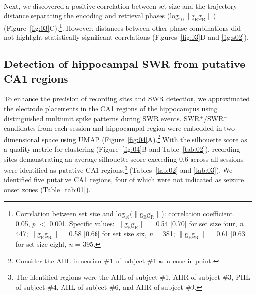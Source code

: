 \documentclass[final,3p,times,twocolumn]{elsarticle}
\providecommand{\DIFaddbegin}{} %
\providecommand{\DIFaddend}{} %
\providecommand{\DIFdelbegin}{} %
\providecommand{\DIFdelend}{} %
\newcommand{\DIFscaledelfig}{0.5}
\newlength{\DIFdelgraphicswidth} %
\newlength{\DIFdelgraphicsheight} %
\newcommand{\DIFaddincludegraphics}[2][]{{\color{blue}\fbox{\DIFOincludegraphics[#1]{#2}}}} %
\newcommand{\DIFdelincludegraphics}[2][]{%
\sbox{\DIFdelgraphicsbox}{\DIFOincludegraphics[#1]{#2}}%
\settoboxwidth{\DIFdelgraphicswidth}{\DIFdelgraphicsbox} %
\settoboxtotalheight{\DIFdelgraphicsheight}{\DIFdelgraphicsbox} %
\scalebox{\DIFscaledelfig}{%
\parbox[b]{\DIFdelgraphicswidth}{\usebox{\DIFdelgraphicsbox}\\[-\baselineskip] \rule{\DIFdelgraphicswidth}{0em}}\llap{\resizebox{\DIFdelgraphicswidth}{\DIFdelgraphicsheight}{%
\setlength{\unitlength}{\DIFdelgraphicswidth}%
\begin{picture}(1,1)%
\thicklines\linethickness{2pt} %
{\color[rgb]{1,0,0}\put(0,0){\framebox(1,1){}}}%
{\color[rgb]{1,0,0}\put(0,0){\line( 1,1){1}}}%
{\color[rgb]{1,0,0}\put(0,1){\line(1,-1){1}}}%
\end{picture}%
}\hspace*{3pt}}} %
} %
\DeclareRobustCommand{\DIFaddbegin}{\DIFOaddbegin \let\includegraphics\DIFaddincludegraphics} %
\DeclareRobustCommand{\DIFaddend}{\DIFOaddend \let\includegraphics\DIFOincludegraphics} %
\DeclareRobustCommand{\DIFdelbegin}{\DIFOdelbegin \let\includegraphics\DIFdelincludegraphics} %
\DeclareRobustCommand{\DIFdelend}{\DIFOaddend \let\includegraphics\DIFOincludegraphics} %
\begin{document}
\DIFdelend \DIFaddbegin \\
\indent
\DIFaddend Next, we discovered a positive correlation between set size and the trajectory distance separating the encoding and retrieval phases ($\mathrm{log_{10}\lVert g_{E}g_{R} \rVert}$) (Figure~\ref{fig:03}C).\footnote{Correlation between set size and $\mathrm{log_{10}(\lVert g_{E}g_{R} \rVert}$): correlation coefficient = 0.05, \textit{p} $<$ 0.001. Specific values: $\mathrm{\lVert g_{E}g_{R} \rVert}$ = 0.54 [0.70] for set size four, \textit{n} = 447; $\mathrm{\lVert g_{E}g_{R} \rVert}$ = 0.58 [0.66] for set size six, \textit{n} = 381; $\mathrm{\lVert g_{E}g_{R} \rVert}$ = 0.61 [0.63] for set size eight, \textit{n} = 395.}. However, distances between other phase combinations did not highlight statistically significant correlations (Figures~\ref{fig:03}D and \ref{fig:s02}).

\subsection{Detection of hippocampal SWR from putative CA1 regions}
To enhance the precision of recording sites and SWR detection, we approximated the electrode placements in the CA1 regions of the hippocampus using distinguished multiunit spike patterns during SWR events. SWR$^+$/SWR$^-$ candidates from each session and hippocampal region were embedded in two-dimensional space using UMAP (Figure~\ref{fig:04}A).\footnote{Consider the AHL in session \#1 of subject \#1 as a case in point.} With the silhouette score as a quality metric for clustering (Figure~\ref{fig:04}B and Table~\ref{tab:02}), recording sites demonstrating an average silhouette score exceeding 0.6 across all sessions were identified as putative CA1 regions.\footnote{The identified regions were the AHL of subject \#1, AHR of subject \#3, PHL of subject \#4, AHL of subject \#6, and AHR of subject \#9.} (Tables~\ref{tab:02} and \ref{tab:03}). We identified five putative CA1 regions, four of which were not indicated as seizure onset zones (Table~\ref{tab:01}).
\DIFdelbegin %
\end{document}
